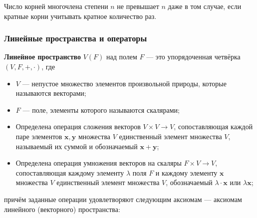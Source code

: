 \documentclass[12pt]{matmex-diploma}
\begin{document}
            Число корней многочлена степени $n$ не превышает $n$ даже в том случае, если кратные корни учитывать кратное количество раз.

        \subsubsection*{Линейные пространства и операторы}
            \textbf{Линейное пространство} $V\left(F\right)$ над полем $F$ — это упорядоченная четвёрка $(V,F,+,\cdot )$, где
            \begin{itemize}
                \item $V$ — непустое множество элементов произвольной природы, которые называются векторами;
                \item $F$ — поле, элементы которого называются скалярами;
                \item Определена операция сложения векторов $V\times V\to V$, сопоставляющая каждой паре элементов $\mathbf {x} ,\mathbf {y}$ множества $V$ единственный элемент множества $V$, называемый их суммой и обозначаемый $\mathbf {x} +\mathbf {y}$;
                \item Определена операция умножения векторов на скаляры $F\times V\to V$, сопоставляющая каждому элементу $\lambda$  поля $F$ и каждому элементу $\mathbf {x}$ множества $V$ единственный элемент множества $V$, обозначаемый $\lambda \cdot \mathbf {x}$  или $\lambda \mathbf {x}$;
            \end{itemize}              
            причём заданные операции удовлетворяют следующим аксиомам — аксиомам линейного (векторного) пространства:
\end{document}
